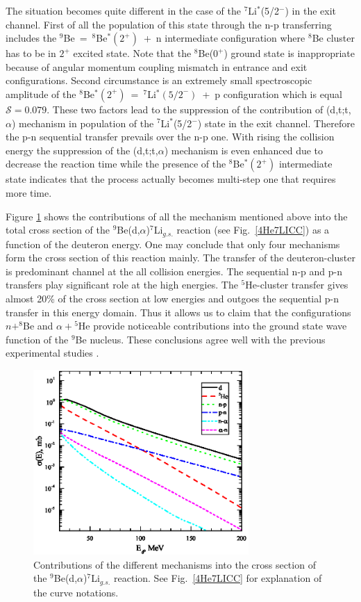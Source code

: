 \documentclass[10pt]{iopart}
\begin{document}
The situation becomes quite different in the case of the ${}^7$Li$^*$(5/2$^-$) in the exit channel. First of all the population of this state through the n-p transferring includes the ${}^9$Be~=~${}^8$Be$^*(2^+)$~+~n intermediate configuration where ${}^8$Be cluster has to be in $2^+$ excited state. Note that the ${}^8$Be($0^+$) ground state is inappropriate because of angular momentum coupling mismatch in entrance and exit configurations. Second circumstance is an extremely small spectroscopic amplitude of the ${}^8$Be$^*(2^+)$~=~${}^7$Li$^*(5/2^-)$~+~p configuration which is equal $\mathcal{S} = 0.079$. These two factors lead to the suppression of the contribution of (d,t;t,$\alpha$) mechanism in population of the ${}^7$Li$^*$(5/2$^-$) state in the exit channel. Therefore the p-n sequential transfer prevails over the n-p one. With rising the collision energy the suppression of the (d,t;t,$\alpha$) mechanism is even enhanced due to decrease the reaction time while the presence of the ${}^8$Be$^*(2^+)$ intermediate state indicates that the process actually becomes multi-step one that requires more time.

Figure \ref{CS} shows the contributions of all the mechanism mentioned above into the total cross section of the ${}^9$Be(d,$\alpha$)${}^7$Li$_{g.s.}$ reaction (see Fig.~\ref{4He7LICC}) as a function of the deuteron energy. One may conclude that only four mechanisms form the cross section of this reaction mainly. The transfer of the deuteron-cluster is predominant channel at the all collision energies. The sequential n-p and p-n transfers play significant role at the high energies. The ${}^5$He-cluster transfer gives almost 20\% of the cross section at low energies and outgoes the sequential p-n transfer in this energy domain. Thus it allows us to claim that the configurations $n+^8$Be and $\alpha+{}^5$He provide noticeable contributions into the ground state wave function of the ${}^9$Be nucleus. These conclusions agree well with the previous experimental studies \cite{brown2007, papka2007}.

\begin{figure}[tp]
\centering
\includegraphics[width=8.2cm]{CS.eps}
\caption{\label{CS} Contributions of the different mechanisms into the cross section of the ${}^9$Be(d,$\alpha$)${}^7$Li$_{g.s.}$ reaction. See Fig.~\ref{4He7LICC} for explanation of the curve notations.}
\end{figure}	
	
\end{document}
